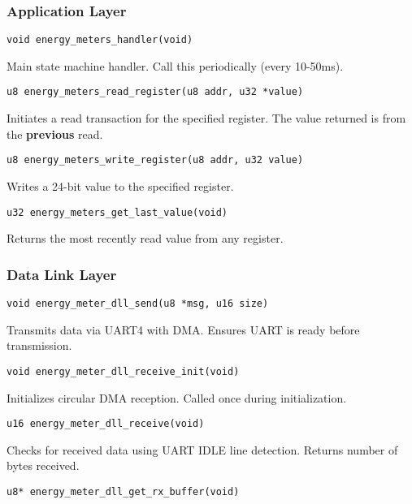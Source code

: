 \documentclass[11pt,a4paper]{article}
\begin{document}
\subsubsection{Application Layer}

\texttt{void energy\_meters\_handler(void)}

Main state machine handler. Call this periodically (every 10-50ms).

\vspace{0.5em}

\texttt{u8 energy\_meters\_read\_register(u8 addr, u32 *value)}

Initiates a read transaction for the specified register. The value returned is from the \textbf{previous} read.

\vspace{0.5em}

\texttt{u8 energy\_meters\_write\_register(u8 addr, u32 value)}

Writes a 24-bit value to the specified register.

\vspace{0.5em}

\texttt{u32 energy\_meters\_get\_last\_value(void)}

Returns the most recently read value from any register.

\subsubsection{Data Link Layer}

\texttt{void energy\_meter\_dll\_send(u8 *msg, u16 size)}

Transmits data via UART4 with DMA. Ensures UART is ready before transmission.

\vspace{0.5em}

\texttt{void energy\_meter\_dll\_receive\_init(void)}

Initializes circular DMA reception. Called once during initialization.

\vspace{0.5em}

\texttt{u16 energy\_meter\_dll\_receive(void)}

Checks for received data using UART IDLE line detection. Returns number of bytes received.

\vspace{0.5em}

\texttt{u8* energy\_meter\_dll\_get\_rx\_buffer(void)}
\end{document}
